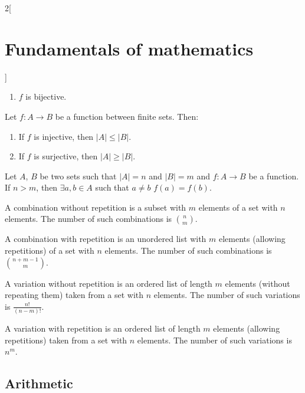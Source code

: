 \documentclass[../../../main.tex]{subfiles}
\begin{document}
\begin{multicols}{2}[\section{Fundamentals of mathematics}]
\begin{prop}
\begin{enumerate}
            \item $f$ is bijective.
        \end{enumerate}
    \end{prop}
    \begin{corollary}
        Let $f:A\rightarrow B$ be a function between finite sets. Then:
        \begin{enumerate}
            \item If $f$ is injective, then $|A|\leq|B|$.
            \item If $f$ is surjective, then $|A|\geq|B|$.
        \end{enumerate}
    \end{corollary}
    \begin{theorem}
        Let $A$, $B$ be two sets such that $|A|=n$ and $|B|=m$ and $f:A\rightarrow B$ be a function. If $n>m$, then $\exists a,b\in A$ such that $a\ne b$ $f(a)=f(b)$.
    \end{theorem}
    \begin{prop}
        A combination without repetition is a subset with $m$ elements of a set with $n$ elements. The number of such combinations is $\binom{n}{m}$.
    \end{prop}
    \begin{prop}
        A combination with repetition is an unordered list with $m$ elements (allowing repetitions) of a set with $n$ elements. The number of such combinations is  $\binom{n+m-1}{m}$.
    \end{prop}
    \begin{prop}
        A variation without repetition is an ordered list of length $m$ elements (without repeating them) taken from a set with $n$ elements. The number of such variations is $\frac{n!}{(n-m)!}$.
    \end{prop}
    \begin{prop}
        A variation with repetition is an ordered list of length $m$ elements (allowing repetitions) taken from a set with $n$ elements. The number of such variations is $n^m$.
    \end{prop}
    \subsection{Arithmetic}

\end{multicols}
\end{document}
